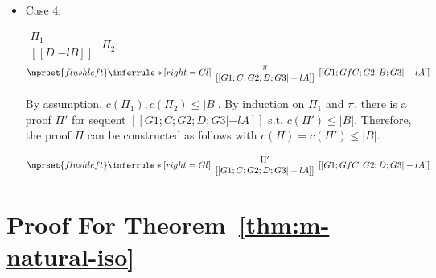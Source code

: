\begin{itemize}
\item Case 4:
      \begin{center}
        \scriptsize
        \begin{math}
          \begin{array}{c}
            \Pi_1 \\
            {[[D |-l B]]}
          \end{array}
        \end{math}
        \qquad\qquad
        $\Pi_2$:
        \begin{math}
          $$\mprset{flushleft}
          \inferrule* [right={\tiny Gl}] {
            {
              \begin{array}{c}
                \pi \\
                {[[G1; C; G2; B; G3 |-l A]]}
              \end{array}
            }
          }{[[G1; Gf C; G2; B; G3 |-l A]]}
        \end{math}
      \end{center}
      By assumption, $c(\Pi_1),c(\Pi_2)\leq |B|$. By induction on $\Pi_1$
      and $\pi$, there is a proof $\Pi'$ for sequent
      $[[G1; C; G2; D; G3 |-l A]]$ s.t. $c(\Pi') \leq |B|$. Therefore, the
      proof $\Pi$ can be constructed as follows with
      $c(\Pi) = c(\Pi') \leq |B|$.
      \begin{center}
        \scriptsize
        \begin{math}
          $$\mprset{flushleft}
          \inferrule* [right={\tiny Gl}] {
            {
              \begin{array}{c}
                \Pi' \\
                {[[G1; C; G2; D; G3 |-l A]]}
              \end{array}
            }
          }{[[G1; Gf C; G2; D; G3 |-l A]]}
        \end{math}
      \end{center}

\end{itemize}



\section{Proof For Theorem~\ref{thm:m-natural-iso}}
\label{app:m-natural-iso}

